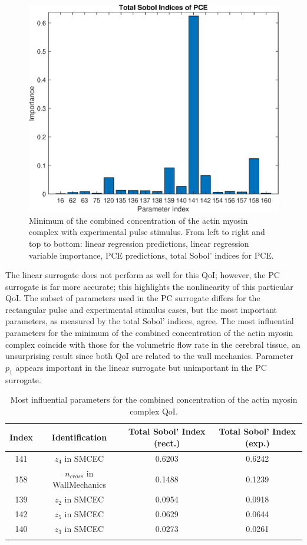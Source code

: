 \begin{figure}[h]
\includegraphics[width=.49 \textwidth]{Figures/AM_AMp_Min_QoI_PCE_SI_Experimental.eps}
\caption{Minimum of the combined concentration of the actin myosin complex with experimental pulse stimulus. From left to right and top to bottom: linear regression predictions, linear regression variable importance, PCE predictions, total Sobol' indices for PCE.}
\label{fig:qoi_AM_AMp_Min_exp}
\end{figure}

The linear surrogate does not perform as well for this QoI; however, the PC surrogate is far more accurate; this highlights the nonlinearity of this particular QoI. The subset of parameters used in the PC surrogate differs for the rectangular pulse and experimental stimulus cases, but the most important parameters, as measured by the total Sobol' indices, agree. The most influential parameters for the minimum of the combined concentration of the actin myosin complex coincide with those for the volumetric flow rate in the cerebral tissue, an unsurprising result since both QoI are related to the wall mechanics. Parameter $p_1$ appears important in the linear surrogate but unimportant in the PC surrogate.

\begin{table}[h]
\centering
{}
\begin{tabular}{cccc}
\toprule
Index & Identification & Total Sobol' Index (rect.) & Total Sobol' Index (exp.)\\
\midrule
141 & $z_4$ in SMCEC & 0.6203 & 0.6242\\
158 & $n_{cross}$ in WallMechanics & 0.1488 &0.1239\\
139 &  $z_2$ in SMCEC & 0.0954 &0.0918\\
142 & $z_5$ in SMCEC & 0.0629 & 0.0644\\
140 & $z_3$ in SMCEC & 0.0273 &0.0261\\
 \arrayrulecolor{black}\bottomrule
\end{tabular}
\caption{Most influential parameters for the combined concentration of the actin myosin complex QoI.}
\label{tab:qoi_AM_AMp_Min}
\end{table}

